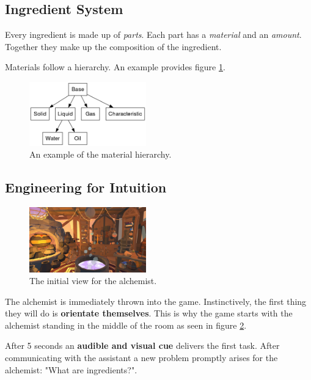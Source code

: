 \documentclass{vgtc}
\begin{document}
\subsection{Ingredient System}

Every ingredient is made up of \emph{parts}. Each part has a \emph{material} and an \emph{amount}. Together they
make up the composition of the ingredient.

Materials follow a hierarchy. An example provides figure \ref{fig:MaterialHierarchyExample}.

\begin{figure}[ht]
  \centering
  \includegraphics[width=0.45\textwidth]{pictures/test.png}
  \caption{An example of the material hierarchy.}
  \label{fig:MaterialHierarchyExample}
\end{figure}

\subsection{Engineering for Intuition}

\begin{figure}[ht]
  \centering
  \includegraphics[width=0.45\textwidth]{pictures/Screenshot_1.png}
  \caption{The initial view for the alchemist.}
  \label{fig:InitialView}
\end{figure}

The alchemist is immediately thrown into the game. Instinctively, the first thing they will do is
\textbf{orientate themselves}. This is why the game starts with the alchemist standing in the middle of the room as 
seen in figure \ref{fig:InitialView}.

After 5 seconds an \textbf{audible and visual cue} delivers the first task. After communicating with the assistant
a new problem promptly arises for the alchemist: "What are ingredients?".
\end{document}
